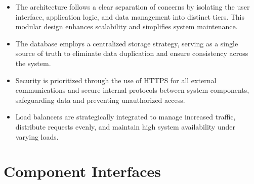 \begin{itemize}
    \item The architecture follows a clear separation of concerns by isolating the user interface, application logic, and data management into distinct tiers. This modular design enhances scalability and simplifies system maintenance.
    
    \item The database employs a centralized storage strategy, serving as a single source of truth to eliminate data duplication and ensure consistency across the system.
    
    \item Security is prioritized through the use of HTTPS for all external communications and secure internal protocols between system components, safeguarding data and preventing unauthorized access.
    
    \item Load balancers are strategically integrated to manage increased traffic, distribute requests evenly, and maintain high system availability under varying loads.
\end{itemize}

\newpage

\section{Component Interfaces}
\label{sec:component_interfaces}

